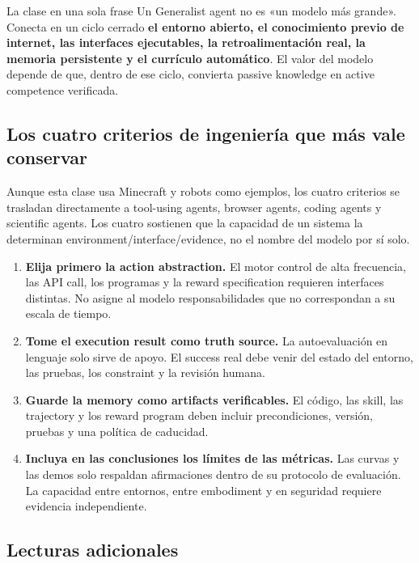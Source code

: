 \begin{importantbox}{La clase en una sola frase}
Un Generalist agent no es «un modelo más grande». Conecta en un ciclo cerrado \textbf{el entorno abierto, el conocimiento previo de internet, las interfaces ejecutables, la retroalimentación real, la memoria persistente y el currículo automático}. El valor del modelo depende de que, dentro de ese ciclo, convierta passive knowledge en active competence verificada.
\end{importantbox}

\subsection{Los cuatro criterios de ingeniería que más vale conservar}

Aunque esta clase usa Minecraft y robots como ejemplos, los cuatro criterios se trasladan directamente a tool-using agents, browser agents, coding agents y scientific agents. Los cuatro sostienen que la capacidad de un sistema la determinan environment/interface/evidence, no el nombre del modelo por sí solo.

\begin{enumerate}
  \item \textbf{Elija primero la action abstraction.} El motor control de alta frecuencia, las API call, los programas y la reward specification requieren interfaces distintas. No asigne al modelo responsabilidades que no correspondan a su escala de tiempo.
  \item \textbf{Tome el execution result como truth source.} La autoevaluación en lenguaje solo sirve de apoyo. El success real debe venir del estado del entorno, las pruebas, los constraint y la revisión humana.
  \item \textbf{Guarde la memory como artifacts verificables.} El código, las skill, las trajectory y los reward program deben incluir precondiciones, versión, pruebas y una política de caducidad.
  \item \textbf{Incluya en las conclusiones los límites de las métricas.} Las curvas y las demos solo respaldan afirmaciones dentro de su protocolo de evaluación. La capacidad entre entornos, entre embodiment y en seguridad requiere evidencia independiente.
\end{enumerate}

\subsection{Lecturas adicionales}

